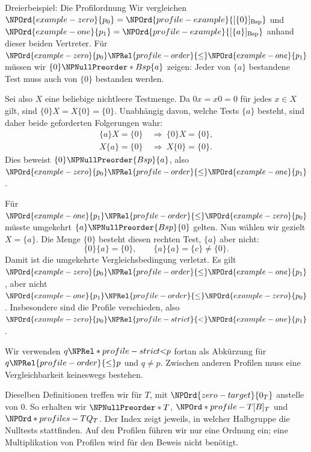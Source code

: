 \begin{NPReadingExample}{Dreierbeispiel: Die Profilordnung}
\hypertarget{nullproducts.reading.example-order}{}
Wir vergleichen \(\NPOrd{example-zero}{p_0}=\NPOrd{profile-example}{[\{0\}]_{\mathrm{Bsp}}}\) und \(\NPOrd{example-one}{p_1}=\NPOrd{profile-example}{[\{a\}]_{\mathrm{Bsp}}}\)
anhand dieser beiden Vertreter. Für \(\NPOrd{example-zero}{p_0}\NPRel{profile-order}{\le} \NPOrd{example-one}{p_1}\) müssen wir
\(\{0\}\NPNullPreorder*{Bsp}\{a\}\) zeigen: Jeder von \(\{a\}\)
bestandene Test muss auch von \(\{0\}\) bestanden werden.

Sei also \(X\) eine beliebige nichtleere Testmenge.
Da \(0x=x0=0\) für jedes \(x\in X\) gilt, sind
\(\{0\}X=X\{0\}=\{0\}\). Unabhängig davon, welche Tests
\(\{a\}\) besteht, sind daher beide geforderten Folgerungen wahr:
\[
 \begin{aligned}
  \{a\}X=\{0\}&\ \Longrightarrow\ \{0\}X=\{0\},\\
  X\{a\}=\{0\}&\ \Longrightarrow\ X\{0\}=\{0\}.
 \end{aligned}
\]
Dies beweist \(\{0\}\NPNullPreorder{Bsp}\{a\}\), also \(\NPOrd{example-zero}{p_0}\NPRel{profile-order}{\le} \NPOrd{example-one}{p_1}\).

Für \(\NPOrd{example-one}{p_1}\NPRel{profile-order}{\le} \NPOrd{example-zero}{p_0}\) müsste umgekehrt
\(\{a\}\NPNullPreorder{Bsp}\{0\}\) gelten. Nun wählen wir gezielt
\(X=\{a\}\). Die Menge \(\{0\}\) besteht diesen rechten Test,
\(\{a\}\) aber nicht:
\[
 \{0\}\{a\}=\{0\},\qquad
 \{a\}\{a\}=\{c\}\ne\{0\}.
\]
Damit ist die umgekehrte Vergleichsbedingung verletzt.
Es gilt \(\NPOrd{example-zero}{p_0}\NPRel{profile-order}{\le} \NPOrd{example-one}{p_1}\), aber nicht \(\NPOrd{example-one}{p_1}\NPRel{profile-order}{\le} \NPOrd{example-zero}{p_0}\).
Insbesondere sind die Profile verschieden, also \(\NPOrd{example-zero}{p_0}\NPRel{profile-strict}{<}\NPOrd{example-one}{p_1}\).
\end{NPReadingExample}
Wir verwenden \(q\NPRel*{profile-strict}{<}p\) fortan als Abkürzung für \(q\NPRel{profile-order}{\le} p\) und \(q\ne p\).
Zwischen anderen Profilen muss eine Vergleichbarkeit keineswegs bestehen.

Dieselben Definitionen treffen wir für \(T\), mit \(\NPOrd{zero-target}{0_T}\) anstelle
von \(0\). So erhalten wir \(\NPNullPreorder*{T}\), \(\NPOrd*{profile-T}{[B]_T}\) und \(\NPOrd*{profiles-T}{Q_T}\).
Der Index zeigt jeweils, in welcher Halbgruppe die Nulltests stattfinden.
Auf den Profilen führen wir nur eine Ordnung ein; eine Multiplikation
von Profilen wird für den Beweis nicht benötigt.

